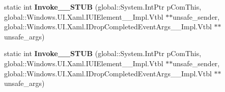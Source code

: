 \begin{DoxyCompactItemize}
static int {\bfseries Invoke\+\_\+\+\_\+\+S\+T\+UB} (global\+::\+System.\+Int\+Ptr p\+Com\+This, global\+::\+Windows.\+U\+I.\+Xaml.\+I\+U\+I\+Element\+\_\+\+\_\+\+Impl.\+Vtbl $\ast$$\ast$unsafe\+\_\+sender, global\+::\+Windows.\+U\+I.\+Xaml.\+I\+Drop\+Completed\+Event\+Args\+\_\+\+\_\+\+Impl.\+Vtbl $\ast$$\ast$unsafe\+\_\+args)
\item 
\mbox{\label{struct_windows_1_1_foundation_1_1_typed_event_handler___a___windows___u_i___xaml___u_i_element__c6192b159f25e6e797ea21530cd542d3_aa9713a422cb8c1611d7a10b478cbf5b8}} 
static int {\bfseries Invoke\+\_\+\+\_\+\+S\+T\+UB} (global\+::\+System.\+Int\+Ptr p\+Com\+This, global\+::\+Windows.\+U\+I.\+Xaml.\+I\+U\+I\+Element\+\_\+\+\_\+\+Impl.\+Vtbl $\ast$$\ast$unsafe\+\_\+sender, global\+::\+Windows.\+U\+I.\+Xaml.\+I\+Drop\+Completed\+Event\+Args\+\_\+\+\_\+\+Impl.\+Vtbl $\ast$$\ast$unsafe\+\_\+args)
\end{DoxyCompactItemize}

